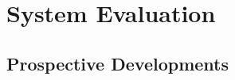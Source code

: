\documentclass[../Dissertation.tex]{subfiles}
\begin{document}
\section{System Evaluation}
\subsection{Prospective Developments}
\end{document}
